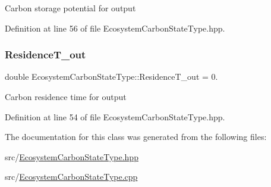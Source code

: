 Carbon storage potential for output 

Definition at line 56 of file Ecosystem\+Carbon\+State\+Type.\+hpp.

\mbox{\label{class_ecosystem_carbon_state_type_aa98b5ed995c5f549c37d4131487d5707}} 
\subsubsection{\texorpdfstring{Residence\+T\+\_\+out}{ResidenceT\_out}}
{\footnotesize\ttfamily double Ecosystem\+Carbon\+State\+Type\+::\+Residence\+T\+\_\+out = 0.}

Carbon residence time for output 

Definition at line 54 of file Ecosystem\+Carbon\+State\+Type.\+hpp.



The documentation for this class was generated from the following files\+:\begin{DoxyCompactItemize}
\item 
src/\mbox{\hyperlink{_ecosystem_carbon_state_type_8hpp}{Ecosystem\+Carbon\+State\+Type.\+hpp}}\item 
src/\mbox{\hyperlink{_ecosystem_carbon_state_type_8cpp}{Ecosystem\+Carbon\+State\+Type.\+cpp}}\end{DoxyCompactItemize}
